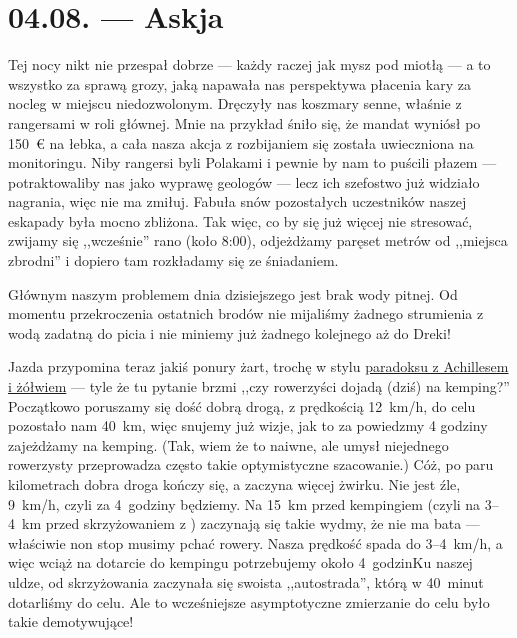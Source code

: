 \chapter*{04.08. --- Askja}

Tej nocy nikt nie przespał dobrze --- każdy raczej jak mysz pod miotłą --- a to wszystko za sprawą grozy, jaką napawała nas perspektywa płacenia kary za nocleg w miejscu niedozwolonym. Dręczyły nas koszmary senne, właśnie z rangersami w roli głównej. Mnie na przykład śniło się, że mandat wyniósł po 150~€ na łebka, a cała nasza akcja z rozbijaniem się została uwieczniona na monitoringu. Niby rangersi byli Polakami i pewnie by nam to puścili płazem --- potraktowaliby nas jako wyprawę geologów --- lecz ich szefostwo już widziało nagrania, więc nie ma zmiłuj. Fabuła snów pozostałych uczestników naszej eskapady była mocno zbliżona. Tak więc, co by się już więcej nie stresować, zwijamy się ,,wcześnie'' rano (koło 8:00), odjeżdżamy paręset metrów od ,,miejsca zbrodni'' i dopiero tam rozkładamy się ze śniadaniem.

Głównym naszym problemem dnia dzisiejszego jest brak wody pitnej. Od momentu przekroczenia ostatnich brodów nie mijaliśmy żadnego strumienia z wodą zadatną do picia i nie miniemy już żadnego kolejnego aż do Dreki!


Jazda przypomina teraz jakiś ponury żart, trochę w stylu \href{http://pl.wikipedia.org/wiki/Paradoksy_Zenona_z_Elei#Achilles_i_.C5.BC.C3.B3.C5.82w.5B2.5D}{paradoksu z Achillesem i żółwiem} --- tyle że tu pytanie brzmi ,,czy rowerzyści dojadą (dziś) na kemping?'' Początkowo poruszamy się dość dobrą drogą, z prędkością 12~km/h, do celu pozostało nam 40~km, więc snujemy już wizje, jak to za powiedzmy 4 godziny zajeżdżamy na kemping. (Tak, wiem że to naiwne, ale umysł niejednego rowerzysty przeprowadza często takie optymistyczne szacowanie.) Cóż, po paru kilometrach dobra droga kończy się, a zaczyna więcej żwirku. Nie jest źle, 9~km/h, czyli za 4~godziny będziemy. Na 15~km przed kempingiem (czyli na \mbox{3--4~km} przed skrzyżowaniem z ) zaczynają się takie wydmy, że nie ma bata --- właściwie non stop musimy pchać rowery. Nasza prędkość spada do \mbox{3--4~km/h}, a więc wciąż na dotarcie do kempingu potrzebujemy około 4~godzin\textellipsis Ku naszej uldze, od skrzyżowania zaczynała się swoista ,,autostrada'', którą w 40~minut dotarliśmy do celu. Ale to wcześniejsze asymptotyczne zmierzanie do celu było takie demotywujące!


